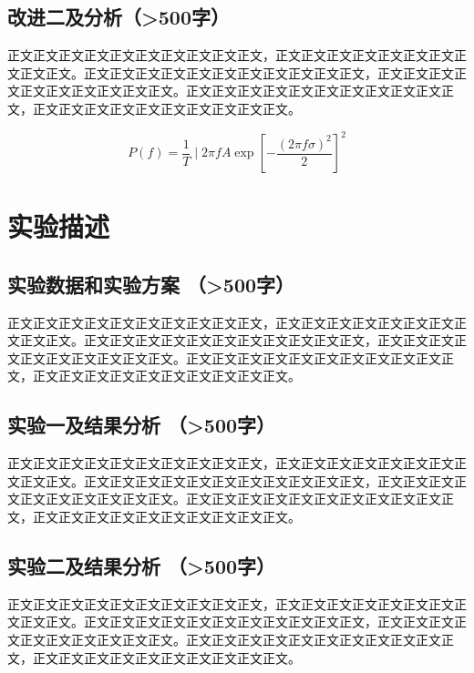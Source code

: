 \documentclass{article}
\begin{document}
\subsection{改进二及分析（>500字）}
正文正文正文正文正文正文正文正文正文正文，正文正文正文正文正文正文正文正文正文正文。正文正文正文正文正文正文正文正文正文正文正文，正文正文正文正文正文正文正文正文正文正文。正文正文正文正文正文正文正文正文正文正文正文，正文正文正文正文正文正文正文正文正文正文。



\begin{equation}\label{eq:sample}
  P(f)=\frac{1}{T} \mid 2 \pi f A \exp \left[-\frac{(2 \pi f \sigma)^{2}}{2}\right]^{2}
  \end{equation}
\section{实验描述}
\subsection{实验数据和实验方案 （>500字）}
正文正文正文正文正文正文正文正文正文正文，正文正文正文正文正文正文正文正文正文正文。正文正文正文正文正文正文正文正文正文正文正文，正文正文正文正文正文正文正文正文正文正文。正文正文正文正文正文正文正文正文正文正文正文，正文正文正文正文正文正文正文正文正文正文。

\subsection{实验一及结果分析 （>500字）}
正文正文正文正文正文正文正文正文正文正文，正文正文正文正文正文正文正文正文正文正文。正文正文正文正文正文正文正文正文正文正文正文，正文正文正文正文正文正文正文正文正文正文。正文正文正文正文正文正文正文正文正文正文正文，正文正文正文正文正文正文正文正文正文正文。

\subsection{实验二及结果分析 （>500字）}
正文正文正文正文正文正文正文正文正文正文，正文正文正文正文正文正文正文正文正文正文。正文正文正文正文正文正文正文正文正文正文正文，正文正文正文正文正文正文正文正文正文正文。正文正文正文正文正文正文正文正文正文正文正文，正文正文正文正文正文正文正文正文正文正文。

\end{document}
